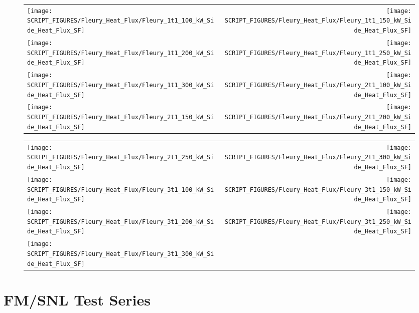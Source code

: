 \begin{figure}[!ht]
\begin{tabular*}{\textwidth}{l@{\extracolsep{\fill}}r}
\texttt{[image: SCRIPT\_FIGURES/Fleury\_Heat\_Flux/Fleury\_1t1\_100\_kW\_Side\_Heat\_Flux\_SF]} &
\texttt{[image: SCRIPT\_FIGURES/Fleury\_Heat\_Flux/Fleury\_1t1\_150\_kW\_Side\_Heat\_Flux\_SF]} \\
\texttt{[image: SCRIPT\_FIGURES/Fleury\_Heat\_Flux/Fleury\_1t1\_200\_kW\_Side\_Heat\_Flux\_SF]} &
\texttt{[image: SCRIPT\_FIGURES/Fleury\_Heat\_Flux/Fleury\_1t1\_250\_kW\_Side\_Heat\_Flux\_SF]} \\
\texttt{[image: SCRIPT\_FIGURES/Fleury\_Heat\_Flux/Fleury\_1t1\_300\_kW\_Side\_Heat\_Flux\_SF]} &
\texttt{[image: SCRIPT\_FIGURES/Fleury\_Heat\_Flux/Fleury\_2t1\_100\_kW\_Side\_Heat\_Flux\_SF]} \\
\texttt{[image: SCRIPT\_FIGURES/Fleury\_Heat\_Flux/Fleury\_2t1\_150\_kW\_Side\_Heat\_Flux\_SF]} &
\texttt{[image: SCRIPT\_FIGURES/Fleury\_Heat\_Flux/Fleury\_2t1\_200\_kW\_Side\_Heat\_Flux\_SF]}
\end{tabular*}
\end{figure}

\begin{figure}[!ht]
\begin{tabular*}{\textwidth}{l@{\extracolsep{\fill}}r}
\texttt{[image: SCRIPT\_FIGURES/Fleury\_Heat\_Flux/Fleury\_2t1\_250\_kW\_Side\_Heat\_Flux\_SF]} &
\texttt{[image: SCRIPT\_FIGURES/Fleury\_Heat\_Flux/Fleury\_2t1\_300\_kW\_Side\_Heat\_Flux\_SF]} \\
\texttt{[image: SCRIPT\_FIGURES/Fleury\_Heat\_Flux/Fleury\_3t1\_100\_kW\_Side\_Heat\_Flux\_SF]} &
\texttt{[image: SCRIPT\_FIGURES/Fleury\_Heat\_Flux/Fleury\_3t1\_150\_kW\_Side\_Heat\_Flux\_SF]} \\
\texttt{[image: SCRIPT\_FIGURES/Fleury\_Heat\_Flux/Fleury\_3t1\_200\_kW\_Side\_Heat\_Flux\_SF]} &
\texttt{[image: SCRIPT\_FIGURES/Fleury\_Heat\_Flux/Fleury\_3t1\_250\_kW\_Side\_Heat\_Flux\_SF]} \\
\texttt{[image: SCRIPT\_FIGURES/Fleury\_Heat\_Flux/Fleury\_3t1\_300\_kW\_Side\_Heat\_Flux\_SF]}
\end{tabular*}
\end{figure}

\clearpage

\section{FM/SNL Test Series}

